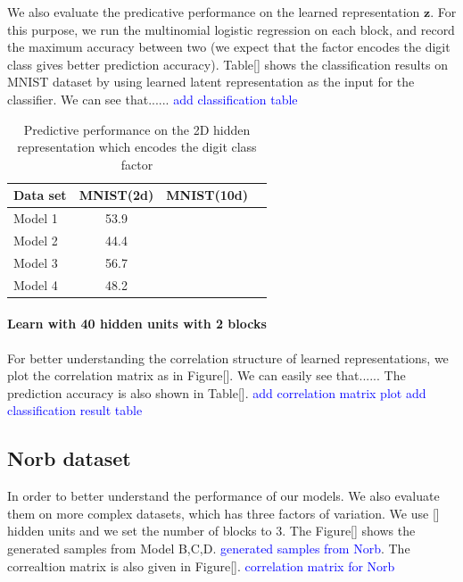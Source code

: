 We also evaluate the predicative performance on the learned representation $\mathbf{z}$. For this purpose, we run the multinomial logistic regression on each block, and record the maximum accuracy between two (we expect that the factor encodes the digit class gives better prediction accuracy). Table[] shows the classification results on MNIST dataset by using learned latent representation as the input for the classifier. We can see that......
\textcolor{blue}{add classification table}

\begin{table}[htb]
	\begin{center}
		\begin{small}
			\begin{sc}
				\begin{tabular}{lccc}
					\hline
					Data set & MNIST(2d)  & MNIST(10d) &   \\
					\hline
					Model 1& 53.9 & &\\
					Model 2 &44.4& &\\
					Model 3 & 56.7& &\\
					Model 4 & 48.2& &\\
					\hline
				\end{tabular}
			\end{sc}
		\end{small}
        \vspace{0.2cm}
		\caption{Predictive performance on the 2D hidden representation which encodes the digit class factor}
\vspace{-0.5cm}		
\label{tab:regression}
	\end{center}
\end{table}




\paragraph{Learn with 40 hidden units with 2 blocks}
For better understanding the correlation structure of learned representations, we plot the correlation matrix as in Figure[]. We can easily see that......  The prediction accuracy is also shown in Table[]. 
\textcolor{blue}{add correlation matrix plot}
\textcolor{blue}{add classification result table}


\subsection{Norb dataset}
In order to better understand the performance of our models. We also evaluate them on more complex datasets, which has three factors of variation. We use [] hidden units and we set the number of blocks to 3.  The Figure[] shows the generated samples from Model B,C,D. \textcolor{blue}{generated samples from Norb}. The correaltion matrix is also given in Figure[]. \textcolor{blue}{correlation matrix for Norb}  


